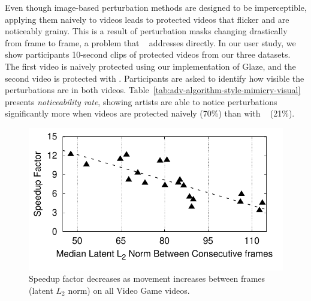   Even though
image-based perturbation methods are designed to be imperceptible, applying
them naively to videos leads to protected videos that flicker and are
noticeably grainy. This is a result of perturbation masks changing
drastically from frame to frame, a problem that \system~ addresses
directly. In our user study, we show participants 10-second clips of
protected videos from our three datasets. The first video is naively protected
using our implementation of Glaze, and the second video is protected with 
\system{}. Participants are asked to identify how visible the
perturbations are in both 
videos. Table~\ref{tab:adv-algorithm-style-mimicry-visual} presents
\textit{noticeability rate}, showing artists are able to notice perturbations
significantly more when videos are protected naively (70\%) than with
\system~ (21\%).

\begin{table}[t]
    \centering
    \caption{Different framerates do not impact protection
      robustness (CLIP-Genre Shift), but higher framerates lead to higher
      speedup factor under \system. (4 Video Game videos.)} 
    \label{table:fps-test}
\end{table}

\begin{figure}[t]
  \centering
  \includegraphics[width=0.9\columnwidth]{plots/eval/consecutive-frames-speedup-eps-converted-to.pdf}
  \vspace{-0.25in}
  \caption{Speedup factor decreases as movement increases between frames (latent $L_2$
    norm) on all Video Game videos.}
  \label{fig:action-across-datasets}
\end{figure}


